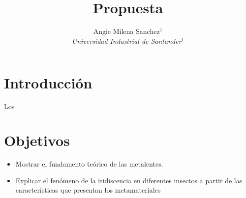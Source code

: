 \documentclass[a4paper, twocolumn, 10pt]{article}
\title{\textbf{ Propuesta}}
\author{ Angie Milena Sanchez$^1$\\ \textit{Universidad Industrial de Santander$^1$}}
\begin{document}
\sloppy 
{}%

\section*{Introducción}

\noindent Los 

\section*{Objetivos}

\begin{itemize}
    \item Mostrar el fundamento teórico de las metalentes.
    \item Explicar el fenómeno de la iridiscencia en diferentes insectos a partir de las características que presentan los metamateriales
\end{itemize}





\printbibliography
\end{document}
